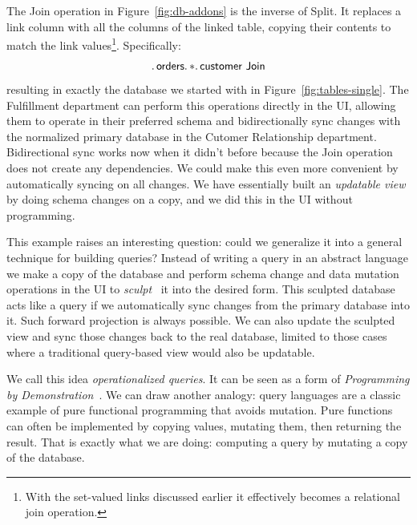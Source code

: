 \documentclass[english,submission]{programming}
\theoremstyle{definition}
\begin{document}
The \textsf{Join} operation in Figure~\ref{fig:db-addons}
is the inverse of \textsf{Split}. It replaces a link column with all the columns of the linked table, copying their contents to match the link values\footnote{With the set-valued links discussed earlier it effectively becomes a relational join operation.}. Specifically:
\[
\ldotp \textsf{orders}\ldotp * \ldotp \textsf{customer Join} \\
\]
resulting in exactly the database we started with in Figure~\ref{fig:tables-single}.
The Fulfillment department can perform this operations directly in the UI, allowing them
to operate in their preferred schema and bidirectionally sync changes with the normalized primary database in the Cutomer Relationship department. Bidirectional sync works now when it didn't before because the \textsf{Join} operation does not create any dependencies. We could make this even more convenient by automatically syncing on all changes. We have essentially built an \textit{updatable view} by doing schema changes on a copy, and we did this in the UI without programming.

This example raises an interesting question: could we generalize it into a general technique for building queries? Instead of writing a query in an abstract language we make a copy of the database and perform schema change and data mutation operations in the UI to \textit{sculpt}~\cite{sculpin} it into the desired form. This sculpted database acts like a query if we automatically sync changes from the primary database into it. Such forward projection is always possible. We can also update the sculpted view and sync those changes back to the real database, limited to those cases where a traditional query-based view would also be updatable.

We call this idea \textit{operationalized queries}. It can be seen as a form of \textit{Programming by Demonstration}~\cite{cypher93-pbd}. We can draw another analogy: query languages are a classic example of pure functional programming that avoids mutation. Pure functions can often be implemented by copying values, mutating them, then returning the result. That is exactly what we are
doing: computing a query by mutating a copy of the database.
\end{document}
